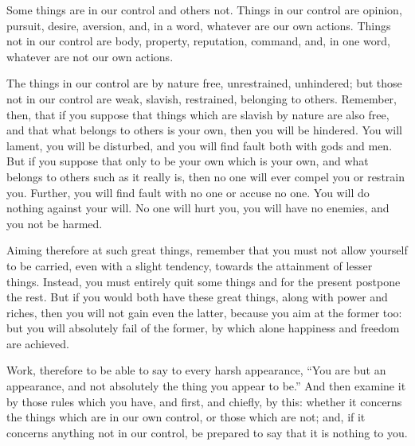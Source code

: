 Some things are in our control and others not. Things in our control
are opinion, pursuit, desire, aversion, and, in a word, whatever are
our own actions. Things not in our control are body, property, reputation,
command, and, in one word, whatever are not our own actions.

The things in our control are by nature free, unrestrained, unhindered;
but those not in our control are weak, slavish, restrained, belonging
to others. Remember, then, that if you suppose that things which are
slavish by nature are also free, and that what belongs to others is
your own, then you will be hindered. You will lament, you will be
disturbed, and you will find fault both with gods and men. But if
you suppose that only to be your own which is your own, and what belongs
to others such as it really is, then no one will ever compel you or
restrain you. Further, you will find fault with no one or accuse no
one. You will do nothing against your will. No one will hurt you,
you will have no enemies, and you not be harmed. 

Aiming therefore at such great things, remember that you must not
allow yourself to be carried, even with a slight tendency, towards
the attainment of lesser things. Instead, you must entirely quit some
things and for the present postpone the rest. But if you would both
have these great things, along with power and riches, then you will
not gain even the latter, because you aim at the former too: but you
will absolutely fail of the former, by which alone happiness and freedom
are achieved. 

Work, therefore to be able to say to every harsh appearance, ``You
are but an appearance, and not absolutely the thing you appear to
be.'' And then examine it by those rules which you have, and first,
and chiefly, by this: whether it concerns the things which are in
our own control, or those which are not; and, if it concerns anything
not in our control, be prepared to say that it is nothing to you.
